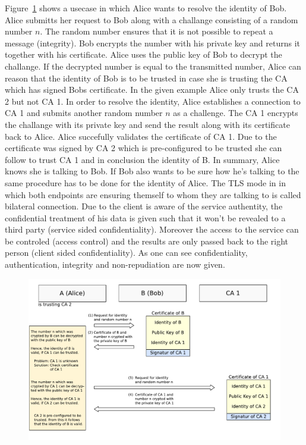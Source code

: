 Figure~\ref{fig:verification_of_certificates} shows a usecase in which Alice wants to resolve the identity of Bob. Alice submitts her request to Bob along with a challange consisting of a random number $n$. 
The random number ensures that it is not possible to repeat a message (integrity).
Bob encrypts the number with his private key and returns it together with his certificate. Alice uses the public key of Bob to decrypt the challange. 
If the decrypted number is equal to the transmitted number, Alice can reason that the identity of Bob is to be trusted in case she is trusting the CA which has signed Bobs certificate. 
%
In the given example Alice only trusts the CA 2 but not CA 1.
In order to resolve the identity, Alice establishes a connection to CA 1 and submits another random number $n$ as a challenge.
The CA 1 encrypts the challange with its private key and send the result along with its certificate back to Alice. Alice succefully validates the certificate of CA 1. Due to the certificate was signed by CA 2 which is pre-configured to be trusted she can follow to trust CA 1 and in conclusion the identity of B. In summary, Alice knows she is talking to Bob. If Bob also wants to be sure how he's talking to the same procedure has to be done for the identity of Alice. The TLS mode in in which both endpoints are ensuring themself to whom they are talking to is called bilateral connection.
Due to the client is aware of the service authentity, the confidential treatment of his data is given such that it won't be revealed to a third party (service sided confidentiality). Moreover the access to the service can be controled (access control) and the results are only passed back to the right person (client sided confidentiality). 
As one can see confidentiality, authentication, integrity and non-repudiation are now given.\\
\begin{figure}[htb]
	\centering%
	\includegraphics[width=13cm]{tex_tls_echoservice/verification.pdf}
	\label{fig:verification_of_certificates}
\end{figure}



